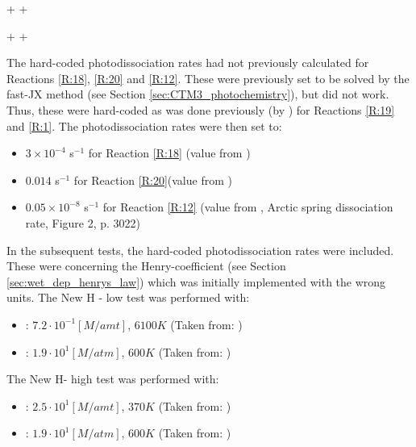 \begin{reaction}
     +  \rightarrow {} + 
    \label{rqn:oh_br2}
\end{reaction}


\begin{reaction}
     +  \rightarrow {} + 
    \label{rqn:oh_hbr}
\end{reaction}

The hard-coded photodissociation rates had not previously calculated for Reactions \ref{R:18}, \ref{R:20} and \ref{R:12}. These were previously set to be solved by the fast-JX method (see Section \ref{sec:CTM3_photochemistry}), but did not work. Thus, these were hard-coded as was done previously (by \cite{Susanne}) for Reactions \ref{R:19} and \ref{R:1}. The photodissociation rates were then set to: 

\begin{itemize}
    \item $3\times10^{-4}$ s$^{-1}$ for Reaction \ref{R:18} (value from \cite{CAO})
    \item $0.014$ s$^{-1}$ for Reaction \ref{R:20}(value from \cite{CAO})
    \item $0.05\times10^{-8}$ s$^{-1}$ for Reaction \ref{R:12} (value from \cite{Papanastasiou2013}, Arctic spring dissociation rate, Figure 2, p. 3022)
\end{itemize}



In the subsequent tests, the hard-coded photodissociation rates were included. These were concerning the Henry-coefficient (see Section \ref{sec:wet_dep_henrys_law}) which was initially implemented with the wrong units. The New H - low test was performed with: 


\begin{itemize}
    \item {}: $7.2\cdot 10^{-1} [M/amt]$, $6100 K$ (Taken from: \cite{Chameides1992})
    \item {}: $1.9\cdot10^1 [M/atm]$, $600 K$ (Taken from: \cite{dean1999})
\end{itemize}

The New H- high test was performed with:  

\begin{itemize}
    \item {}: $2.5 \cdot 10^{1} [M/amt]$, $370 K$ (Taken from: \cite{dean1999})
    \item {}: $1.9\cdot10^1 [M/atm]$, $600 K$ (Taken from: \cite{dean1999})
\end{itemize}

